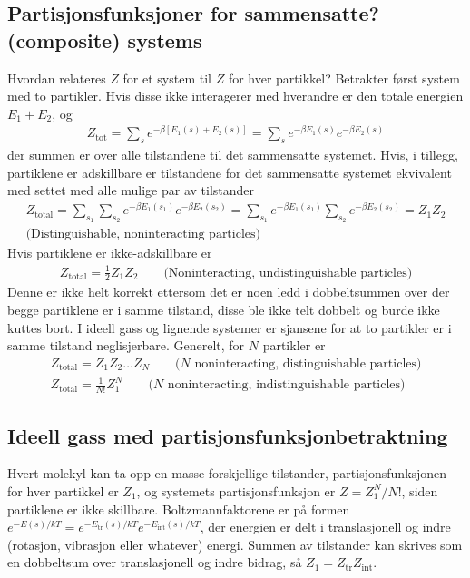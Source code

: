 \documentclass[12pt]{article}
\begin{document}
\subsection{Partisjonsfunksjoner for sammensatte? (composite) systems}
Hvordan relateres $Z$ for et system til $Z$ for hver partikkel? Betrakter først system med
to partikler. Hvis disse ikke interagerer med hverandre er den totale energien $E_1 + E_2$, og
\begin{align*}
  Z_\text{tot} = \sum_s e^{-\beta[E_1(s) + E_2(s)]} = \sum_s e^{-\beta E_1(s)} e^{-\beta E_2(s)}
\end{align*}
der summen er over alle tilstandene til det sammensatte systemet. Hvis, i tillegg,
partiklene er adskillbare er tilstandene for det sammensatte systemet ekvivalent med
settet med alle mulige par av tilstander
\begin{align*}
  Z_\text{total} = \sum_{s_1}\sum_{s_2} e^{-\beta E_1(s_1)} e^{-\beta E_2(s_2)} = \sum_{s_1} e^{-\beta E_1(s_1)} \sum_{s_2} e^{-\beta E_2(s_2)} = Z_1 Z_2 \\
  \text{(Distinguishable, noninteracting particles)}
\end{align*}
Hvis partiklene er ikke-adskillbare er
\begin{align*}
  Z_\text{total} = \frac{1}{2}Z_1 Z_2\qquad \text{(Noninteracting, undistinguishable particles)}
\end{align*}
Denne er ikke helt korrekt ettersom det er noen ledd i dobbeltsummen over der begge
partiklene er i samme tilstand, disse ble ikke telt dobbelt og burde ikke kuttes bort. I ideell
gass og lignende systemer er sjansene for at to partikler er i samme tilstand neglisjerbare.
Generelt, for $N$ partikler er
\begin{align*}
  Z_\text{total} = Z_1 Z_2 \hdots Z_N \qquad \text{($N$ noninteracting, distinguishable particles)} \\
  Z_\text{total} = \frac{1}{N!} Z_1^N \qquad \text{($N$ noninteracting, indistinguishable particles)}
\end{align*}
\subsection{Ideell gass med partisjonsfunksjonbetraktning}
Hvert molekyl kan ta opp en masse forskjellige tilstander, partisjonsfunksjonen for
hver partikkel er $Z_1$, og systemets partisjonsfunksjon er $Z = Z_1^N / N!$, siden
partiklene er ikke skillbare. Boltzmannfaktorene er på formen $e^{-E(s)/kT} = e^{-E_\text{tr}(s)/kT} e^{-E_\text{int}(s)/kT}$,
der energien er delt i translasjonell og indre (rotasjon, vibrasjon eller whatever) energi.
Summen av tilstander kan skrives som en dobbeltsum over translasjonell og indre bidrag, så $Z_1 = Z_\text{tr} Z_\text{int}$.
\end{document}

